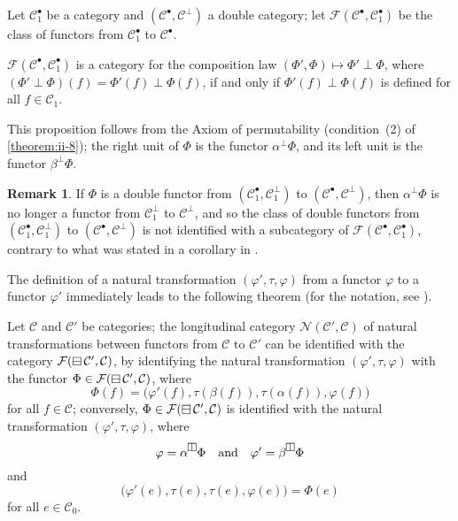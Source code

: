 \documentclass[a4paper,fleqn]{article}
\theoremstyle{plain}
\newenvironment{theorem}[1]
  {\renewcommand\theinnertheorem{#1}\innertheorem}
  {\endinnertheorem}
\newenvironment{proposition}[1]
  {\renewcommand\theinnerproposition{#1}\innerproposition}
  {\endinnerproposition}
\theoremstyle{definition}
\newtheorem*{remark}{Remark}
\newcommand{\oldpage}[1]{{\marginpar{\footnotesize$\bigg\vert$\,\,\,\,\textit{p.~#1}}}}
\newcommand{\textand}{\quad\text{and}\quad}
\newcommand{\CC}{\mathcal{C}}
\newcommand{\FF}{\mathcal{F}}
\newcommand{\NN}{\mathcal{N}}
\newcommand{\hsqbox}{{\boxminus}}
\newcommand{\vsqbox}{{\rotatebox{90}{$\boxminus$}}}
\DeclareMathOperator{\hsq}{\raisebox{-.05em}{$\hsqbox$}}
\begin{document}
Let $\CC_1^\bullet$ be a category and $(\CC^\bullet,\CC^\perp)$ a double category;
let $\FF(\CC^\bullet,\CC_1^\bullet)$ be the class of functors from $\CC_1^\bullet$ to $\CC^\bullet$.

\begin{proposition}{14}
\label{proposition:ii-14}
  $\FF(\CC^\bullet,\CC_1^\bullet)$ is a category for the composition law $(\Phi',\Phi)\mapsto\Phi'\perp\Phi$, where $(\Phi'\perp\Phi)(f)=\Phi'(f)\perp\Phi(f)$, if and only if $\Phi'(f)\perp\Phi(f)$ is defined for all $f\in\CC_1$.
\end{proposition}

This proposition follows from the Axiom of permutability (condition~(2) of \cref{theorem:ii-8});
the right unit of $\Phi$ is the functor $\alpha^\perp\Phi$, and its left unit is the functor $\beta^\perp\Phi$.

\begin{remark}
  If $\Phi$ is a double functor from $(\CC_1^\bullet,\CC_1^\perp)$ to $(\CC^\bullet,\CC^\perp)$, then $\alpha^\perp\Phi$ is no longer a functor from $\CC_1^\perp$ to $\CC^\perp$, and so the class of double functors from $(\CC_1^\bullet,\CC_1^\perp)$ to $(\CC^\bullet,\CC^\perp)$ is not identified with a subcategory of $\FF(\CC^\bullet,\CC_1^\bullet)$, contrary to what was stated in a corollary in \cite{3e}.
\end{remark}

The definition of a natural transformation $(\varphi',\tau,\varphi)$ from a functor $\varphi$ to a functor $\varphi'$ immediately leads to the following theorem (for the notation, see \cite{3d}).

\begin{theorem}{7}
\label{theorem:ii-7}
  Let $\CC$ and $\CC'$ be categories;
  the longitudinal category $\NN(\CC',\CC)$ of natural transformations between functors from $\CC$ to $\CC'$ can be identified with the category $\FF(\hsq\CC',\CC)$, by identifying the natural transformation $(\varphi',\tau,\varphi)$ with the functor $\Phi\in\FF(\hsq\CC',\CC)$, where
  \[
    \Phi(f)
    = \big(
      \varphi'(f), \tau(\beta(f)), \tau(\alpha(f)), \varphi(f)
    \big)
  \]
  for all $f\in\CC$;
  \oldpage{396}
  conversely, $\Phi\in\FF(\hsq\CC',\CC)$ is identified with the natural transformation $(\varphi',\tau,\varphi)$, where
  \[
    \varphi=\alpha^\vsqbox\Phi
    \textand
    \varphi'=\beta^\vsqbox\Phi
  \]
  and
  \[
    \big(
      \varphi'(e), \tau(e), \tau(e), \varphi(e)
    \big)
    = \Phi(e)
  \]
  for all $e\in\CC_0$.
\end{theorem}
\end{document}
